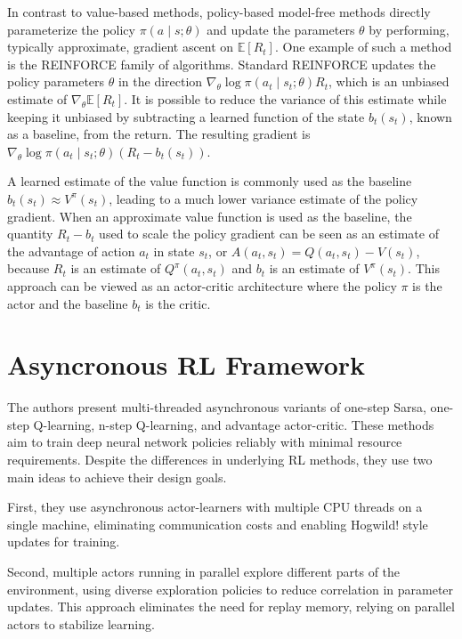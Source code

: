 \documentclass{article}
\begin{document}
In contrast to value-based methods, policy-based model-free methods directly parameterize the policy \(\pi(a \mid s; \theta)\) and update the parameters \(\theta\) by performing, typically approximate, gradient ascent on \(\mathbb{E}[R_t]\). One example of such a method is the REINFORCE family of algorithms. Standard REINFORCE updates the policy parameters \(\theta\) in the direction \(\nabla_\theta \log \pi(a_t \mid s_t; \theta) R_t\), which is an unbiased estimate of \(\nabla_\theta \mathbb{E}[R_t]\). It is possible to reduce the variance of this estimate while keeping it unbiased by subtracting a learned function of the state \(b_t(s_t)\), known as a baseline, from the return. The resulting gradient is \(\nabla_\theta \log \pi(a_t \mid s_t; \theta) (R_t - b_t(s_t))\).

A learned estimate of the value function is commonly used as the baseline \(b_t(s_t) \approx V^\pi(s_t)\), leading to a much lower variance estimate of the policy gradient. When an approximate value function is used as the baseline, the quantity \(R_t - b_t\) used to scale the policy gradient can be seen as an estimate of the advantage of action \(a_t\) in state \(s_t\), or \(A(a_t, s_t) = Q(a_t, s_t) - V(s_t)\), because \(R_t\) is an estimate of \(Q^\pi(a_t, s_t)\) and \(b_t\) is an estimate of \(V^\pi(s_t)\). This approach can be viewed as an actor-critic architecture where the policy \(\pi\) is the actor and the baseline \(b_t\) is the critic.

\section{Asyncronous RL Framework}
The authors present multi-threaded asynchronous variants of one-step Sarsa, one-step Q-learning, n-step Q-learning, and advantage actor-critic. These methods aim to train deep neural network policies reliably with minimal resource requirements. Despite the differences in underlying RL methods, they use two main ideas to achieve their design goals.

First, they use asynchronous actor-learners with multiple CPU threads on a single machine, eliminating communication costs and enabling Hogwild! style updates for training.

Second, multiple actors running in parallel explore different parts of the environment, using diverse exploration policies to reduce correlation in parameter updates. This approach eliminates the need for replay memory, relying on parallel actors to stabilize learning.
\end{document}
